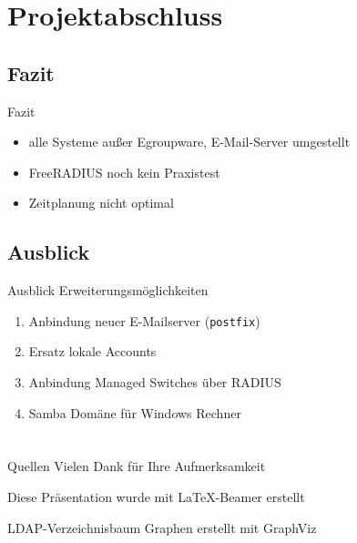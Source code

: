 \documentclass[handout,svgnames]{beamer}
\begin{document}
\section{Projektabschluss}
\subsection{Fazit}
\begin{frame}{Fazit}
\begin{itemize}
	\item alle Systeme außer Egroupware, E-Mail-Server umgestellt
	\item FreeRADIUS noch kein Praxistest
	\item Zeitplanung nicht optimal
\end{itemize}
\end{frame}


\subsection{Ausblick}
\begin{frame}{Ausblick}
	Erweiterungsmöglichkeiten
	\begin{enumerate}
		\item Anbindung neuer E-Mailserver (\texttt{postfix})
		\item Ersatz lokale Accounts
		\item Anbindung Managed Switches über RADIUS
		\item Samba Domäne für Windows Rechner
	\end{enumerate}
\end{frame}

\section{}%
\begin{frame}{Quellen}
	Vielen Dank für Ihre Aufmerksamkeit
	
	\medskip
	\medskip Diese Präsentation wurde mit \LaTeX{}-Beamer erstellt
	
	LDAP-Verzeichnisbaum Graphen erstellt mit GraphViz
\end{frame}
\end{document}
